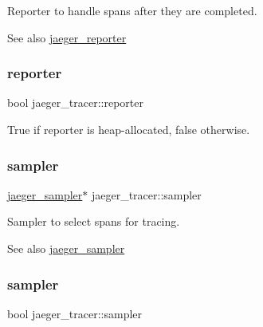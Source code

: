 Reporter to handle spans after they are completed. 

\begin{DoxySeeAlso}{See also}
\mbox{\hyperlink{structjaeger__reporter}{jaeger\+\_\+reporter}} 
\end{DoxySeeAlso}
\mbox{\label{structjaeger__tracer_a7d7447ff17fbafd8adf6e68dfba758e9}} 
\subsubsection{\texorpdfstring{reporter}{reporter}\hspace{0.1cm}{\footnotesize\ttfamily [2/2]}}
{\footnotesize\ttfamily bool jaeger\+\_\+tracer\+::reporter}



True if reporter is heap-\/allocated, false otherwise. 

\mbox{\label{structjaeger__tracer_a988ac3ac189df44661bedc45d55b56c8}} 
\subsubsection{\texorpdfstring{sampler}{sampler}\hspace{0.1cm}{\footnotesize\ttfamily [1/2]}}
{\footnotesize\ttfamily \mbox{\hyperlink{structjaeger__sampler}{jaeger\+\_\+sampler}}$\ast$ jaeger\+\_\+tracer\+::sampler}



Sampler to select spans for tracing. 

\begin{DoxySeeAlso}{See also}
\mbox{\hyperlink{structjaeger__sampler}{jaeger\+\_\+sampler}} 
\end{DoxySeeAlso}
\mbox{\label{structjaeger__tracer_a77efb5d19028805e0531787e7059dd39}} 
\subsubsection{\texorpdfstring{sampler}{sampler}\hspace{0.1cm}{\footnotesize\ttfamily [2/2]}}
{\footnotesize\ttfamily bool jaeger\+\_\+tracer\+::sampler}



